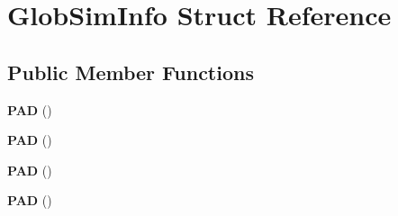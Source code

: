 \hypertarget{structGlobSimInfo}{\section{Glob\-Sim\-Info Struct Reference}
\label{structGlobSimInfo}
}
\subsection*{Public Member Functions}
\begin{DoxyCompactItemize}
\item 
\hypertarget{structGlobSimInfo_af935afdb099067b849b990db2df55447}{{\bfseries P\-A\-D} ()}\label{structGlobSimInfo_af935afdb099067b849b990db2df55447}

\item 
\hypertarget{structGlobSimInfo_af935afdb099067b849b990db2df55447}{{\bfseries P\-A\-D} ()}\label{structGlobSimInfo_af935afdb099067b849b990db2df55447}

\item 
\hypertarget{structGlobSimInfo_af935afdb099067b849b990db2df55447}{{\bfseries P\-A\-D} ()}\label{structGlobSimInfo_af935afdb099067b849b990db2df55447}

\item 
\hypertarget{structGlobSimInfo_af935afdb099067b849b990db2df55447}{{\bfseries P\-A\-D} ()}\label{structGlobSimInfo_af935afdb099067b849b990db2df55447}

\end{DoxyCompactItemize}
